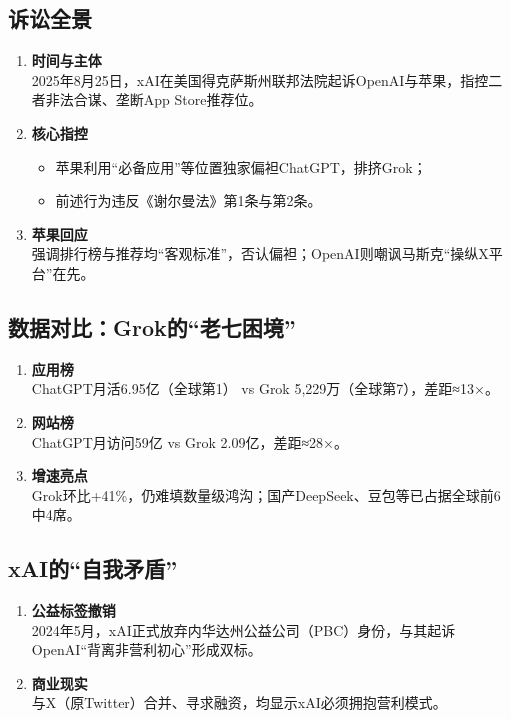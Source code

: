 \subsection{诉讼全景}
\begin{enumerate}[leftmargin=*, nosep]
    \item \textbf{时间与主体}  \\
    2025年8月25日，xAI在美国得克萨斯州联邦法院起诉OpenAI与苹果，指控二者非法合谋、垄断App Store推荐位。
    \item \textbf{核心指控}  
    \begin{itemize}[nosep]
        \item 苹果利用“必备应用”等位置独家偏袒ChatGPT，排挤Grok；  
        \item 前述行为违反《谢尔曼法》第1条与第2条。
    \end{itemize}
    \item \textbf{苹果回应}  \\
    强调排行榜与推荐均“客观标准”，否认偏袒；OpenAI则嘲讽马斯克“操纵X平台”在先。
\end{enumerate}

\subsection{数据对比：Grok的“老七困境”}
\begin{enumerate}[leftmargin=*, nosep]
    \item \textbf{应用榜}  \\
    ChatGPT月活6.95亿（全球第1） vs Grok 5,229万（全球第7），差距≈13×。
    \item \textbf{网站榜}  \\
    ChatGPT月访问59亿 vs Grok 2.09亿，差距≈28×。
    \item \textbf{增速亮点}  \\
    Grok环比+41\%，仍难填数量级鸿沟；国产DeepSeek、豆包等已占据全球前6中4席。
\end{enumerate}

\subsection{xAI的“自我矛盾”}
\begin{enumerate}[leftmargin=*, nosep]
    \item \textbf{公益标签撤销}  \\
    2024年5月，xAI正式放弃内华达州公益公司（PBC）身份，与其起诉OpenAI“背离非营利初心”形成双标。
    \item \textbf{商业现实}  \\
    与X（原Twitter）合并、寻求融资，均显示xAI必须拥抱营利模式。
\end{enumerate}

